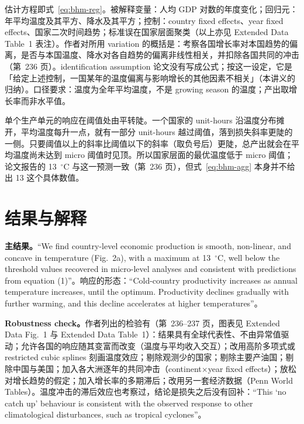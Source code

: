 \begin{ident}
估计方程即式~\ref{eq:bhm-reg}。被解释变量：人均 GDP 对数的年度变化；回归元：年平均温度及其平方、降水及其平方；控制：country fixed effects、year fixed effects、国家二次时间趋势；标准误在国家层面聚类（以上亦见 Extended Data Table~1 表注）。作者对所用 variation 的概括是：考察各国增长率对本国趋势的偏离，是否与本国温度、降水对各自趋势的偏离非线性相关，并扣除各国共同的冲击（第~236 页）。identification assumption 论文没有写成公式；按这一设定，它是「给定上述控制，一国某年的温度偏离与影响增长的其他因素不相关」（本讲义的归纳）。口径要求：温度为全年平均温度，不是 growing season 的温度；产出取增长率而非水平值。
\end{ident}

\begin{intuition}[为什么加总会压低最优温度]
单个生产单元的响应在阈值处由平转陡。一个国家的 unit-hours 沿温度分布摊开，平均温度每升一点，就有一部分 unit-hours 越过阈值，落到损失斜率更陡的一侧。只要阈值以上的斜率比阈值以下的斜率（取负号后）更陡，总产出就会在平均温度尚未达到 micro 阈值时见顶。所以国家层面的最优温度低于 micro 阈值；论文报告的 13~$^\circ$C 与这一预测一致（第~236 页），但式~\ref{eq:bhm-agg} 本身并不给出 13 这个具体数值。
\end{intuition}

\section{结果与解释}

\textbf{主结果。}``We find country-level economic production is smooth, non-linear, and concave in temperature (Fig.~2a), with a maximum at 13~$^\circ$C, well below the threshold values recovered in micro-level analyses and consistent with predictions from equation (1)''\citep[第~236 页]{burke2015global}。响应的形态：``Cold-country productivity increases as annual temperature increases, until the optimum. Productivity declines gradually with further warming, and this decline accelerates at higher temperatures''\citep[第~236 页]{burke2015global}。

\textbf{Robustness check。}作者列出的检验有（第~236--237 页，图表见 Extended Data Fig.~1 与 Extended Data Table~1）：结果具有全球代表性、不由异常值驱动；允许各国的响应随其变富而改变（温度与平均收入交互）；改用高阶多项式或 restricted cubic splines 刻画温度效应；剔除观测少的国家；剔除主要产油国；剔除中国与美国；加入各大洲逐年的共同冲击（continent$\times$year fixed effects）；放松对增长趋势的假定；加入增长率的多期滞后；改用另一套经济数据（Penn World Tables）。温度冲击的滞后效应也考察过，结论是损失之后没有回补：``This `no catch up' behaviour is consistent with the observed response to other climatological disturbances, such as tropical cyclones''\citep[第~237 页]{burke2015global}。

